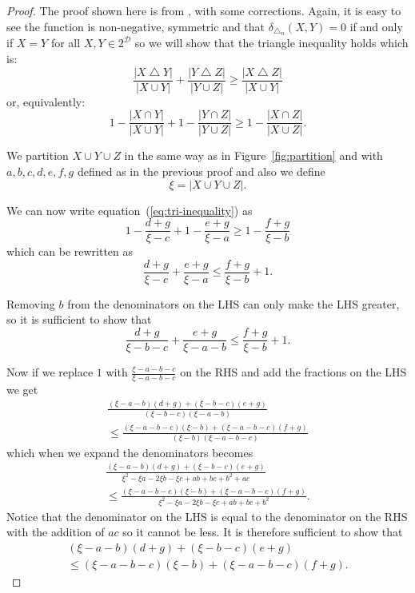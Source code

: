 \documentclass[a4paper]{report}
\DeclareMathOperator{\symdif}{\bigtriangleup}
\newcommand{\dset}{\mathcal{D}}
\begin{document}
\begin{proof}
  The proof shown here is from \citep{yianilos91}, with some corrections.
  Again, it is easy to see the function is non-negative, symmetric and that
  $\delta_{\symdif_n}(X,Y)=0$ if and only if $X=Y$ for all $X,Y \in 2^{\dset}$
  so we will show that the triangle inequality holds which is:
  \begin{equation*}
    \frac{|X \symdif Y|}{|X \cup Y|} + \frac{|Y \symdif Z|}{|Y \cup Z|} \geq
    \frac{|X \symdif Z|}{|X \cup Y|}
  \end{equation*}
  or, equivalently:
  \begin{equation}
    \label{eq:tri-inequality}
    1 - \frac{|X \cap Y|}{|X \cup Y|} +
    1 - \frac{|Y \cap Z|}{|Y \cup Z|} \geq
    1 - \frac{|X \cap Z|}{|X \cup Z|}.
  \end{equation}

  We partition $X \cup Y \cup Z$ in the same way as in
  Figure~\ref{fig:partition} and with $a,b,c,d,e,f,g$ defined as in the
  previous proof and also we define
  \begin{equation*}
    \xi  = |X \cup Y \cup Z|.
  \end{equation*}

  We can now write equation~(\ref{eq:tri-inequality}) as
  \begin{equation*}
    1 - \frac{d+g}{\xi -c} + 1 - \frac{e+g}{\xi -a} \geq 1 - \frac{f+g}{\xi -b}
  \end{equation*}
  which can be rewritten as
  \begin{equation*}
    \frac{d+g}{\xi -c} + \frac{e+g}{\xi -a} \leq \frac{f+g}{\xi -b} + 1.
  \end{equation*}

  Removing $b$ from the denominators on the LHS can only make the LHS
  greater, so it is sufficient to show that
  \begin{equation*}
    \frac{d+g}{\xi -b-c} + \frac{e+g}{\xi -a-b} \leq \frac{f+g}{\xi -b} + 1.
  \end{equation*}

  Now if we replace $1$ with $\frac{\xi -a-b-c}{\xi -a-b-c}$ on the RHS and add
  the fractions on the LHS we get
  \begin{multline*}
    \frac{(\xi -a-b)(d+g)+(\xi -b-c)(e+g)}{(\xi -b-c)(\xi -a-b)}\\
    \leq \frac{(\xi -a-b-c)(\xi -b)+(\xi -a-b-c)(f+g)}{(\xi -b)(\xi -a-b-c)}
  \end{multline*}
  which when we expand the denominators becomes
  \begin{multline*}
    \frac{(\xi -a-b)(d+g)+(\xi -b-c)(e+g)}{\xi ^2-\xi a-2\xi b-\xi c+ab+bc+b^2+ac}\\
    \leq \frac{(\xi -a-b-c)(\xi -b)+(\xi -a-b-c)(f+g)}{\xi ^2-\xi a-2\xi b-\xi c+ab+bc+b^2}.
  \end{multline*}
  Notice that the denominator on the LHS is equal to the denominator on the
  RHS with the addition of $ac$ so it cannot be less.  It is therefore
  sufficient to show that
  \begin{multline*}
    (\xi -a-b)(d+g)+(\xi -b-c)(e+g)\\
    \leq (\xi -a-b-c)(\xi -b)+(\xi -a-b-c)(f+g).
  \end{multline*}


\end{proof}
\end{document}
